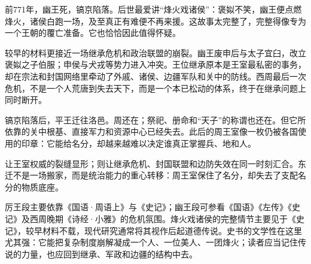 前771年，幽王死，镐京陷落。后世最爱讲“烽火戏诸侯”：褒姒不笑，幽王便点燃烽火，诸侯白跑一场，及至真正有难便不再来援。这故事太完整了，完整得像专为一个王朝的覆亡准备。它也恰恰因此值得怀疑。

较早的材料更接近一场继承危机和政治联盟的崩裂。幽王废申后与太子宜臼，改立褒姒之子伯服；申侯与犬戎等势力进入冲突。王位继承原本是王室最私密的事务，却在宗法和封国网络里牵动了外戚、诸侯、边疆军队和关中的防线。西周最后一次危机，不是一个人荒唐到失去天下，而是一个本已松动的体系，终于在继承问题上同时断开。

镐京陷落后，平王迁往洛邑。周还在；祭祀、册命和“天子”的称谓也还在。但它所依靠的关中根基、直接军力和资源中心已经失去。此后的周王室像一枚仍被各国使用的印章：它能给名分，却越来越难以决定谁真正掌握兵、地和人。

\begin{causalchain}[从共和到东迁]
让王室权威的裂缝显形；则让继承危机、封国联盟和边防失效在同一时刻汇合。东迁不是一场搬家，而是统治能力的重心转移：周王室保住了名分，却失去了支配名分的物质底座。
\end{causalchain}

\begin{sourcenote}[传说、诗歌与政治过程]
厉王段主要依靠《国语·周语上》与《史记》；幽王段可参看《国语》《左传》《史记》及西周晚期《诗经·小雅》的危机氛围。烽火戏诸侯的完整情节主要见于《史记》，较早材料不载，现代研究通常将其视作后起道德传说。史书的文学性在这里尤其强：它能把复杂制度崩解凝成一个人、一位美人、一团烽火；读者应当记住传说的力量，也应回到继承、军政和边疆的结构中去。
\end{sourcenote}
